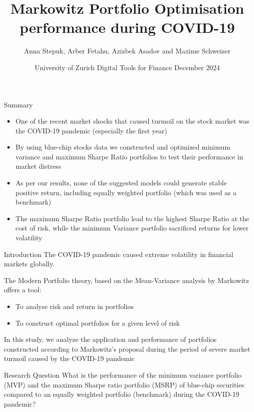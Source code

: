 \documentclass{beamer}
\title{Markowitz Portfolio Optimisation performance during COVID-19}
\author{Anna Stepuk, Arber Fetahu, Azizbek Asadov and Maxime Schweizer}
\date[14 December 2024]{University of Zurich
\newline
Digital Tools for Finance
\newline
\newline
14 December 2024}
\begin{document}
\begin{frame}
  \titlepage
\end{frame}

\begin{frame}{Summary}
\begin{itemize}
\item One of the recent market shocks that caused turmoil on the stock market was the COVID-19 pandemic (especially the first year)
\item By using blue-chip stocks data we constructed and optimized minimum variance and maximum Sharpe Ratio portfolios to test their performance in market distress 
\item As per our results, none of the suggested models could generate stable positive return, including equally weighted portfolio (which was used as a benchmark)
\item The maximum Sharpe Ratio portfolio lead to the highest Sharpe Ratio at the cost of risk, while the minimum Variance portfolio sacrificed returns for lower volatility
\end{itemize}
\end{frame}






\begin{frame}{Introduction}
The COVID-19 pandemic caused extreme volatility in financial markets globally.

\vspace{0.5cm}

The Modern Portfolio theory, based on the Mean-Variance analysis by Markowitz offers a tool:

\begin{itemize}
    \item To analyse risk and return in portfolios
    \item To construct optimal portfolios for a given level of risk
\end{itemize}

\vspace{0.5cm}

In this study, we analyze the application and performance of portfolios constructed according to Markowitz's proposal during the period of severe market turmoil caused by the COVID-19 pandemic

\end{frame}





\begin{frame}{Research Question}
What is the performance of the minimum variance portfolio (MVP) and the maximum Sharpe ratio portfolio (MSRP) of blue-chip securities compared to an equally weighted portfolio (benchmark) during the COVID-19 pandemic? 


\end{frame}
\end{document}
